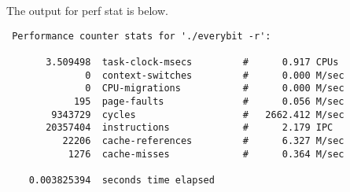 \documentclass[12pt]{article}
\begin{document}
The output for perf stat is below.  
\begin{verbatim}
 Performance counter stats for './everybit -r':

       3.509498  task-clock-msecs         #      0.917 CPUs 
              0  context-switches         #      0.000 M/sec
              0  CPU-migrations           #      0.000 M/sec
            195  page-faults              #      0.056 M/sec
        9343729  cycles                   #   2662.412 M/sec
       20357404  instructions             #      2.179 IPC  
          22206  cache-references         #      6.327 M/sec
           1276  cache-misses             #      0.364 M/sec

    0.003825394  seconds time elapsed
\end{verbatim}
\end{document}
